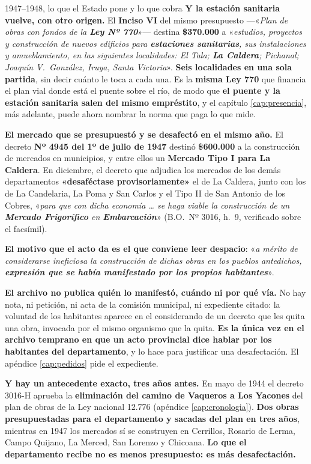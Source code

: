 \begin{ficha}{1947--1948, lo que el Estado pone y lo que cobra}
\textbf{Y la estación sanitaria vuelve, con otro origen.} El \textbf{Inciso VI} del mismo
presupuesto ---«\textit{Plan de obras con fondos de la \textbf{Ley Nº 770}}»--- destina
\textbf{\$370.000} a «\textit{estudios, proyectos y construcción de nuevos edificios para
\textbf{estaciones sanitarias}, sus instalaciones y amueblamiento, en las siguientes
localidades: El Tala; \textbf{La Caldera}; Pichanal; Joaquín V.\ González, Iruya, Santa
Victoria}». \textbf{Seis localidades en una sola partida}, sin decir cuánto le toca a cada una.
Es la \textbf{misma Ley 770} que financia el plan vial donde está el puente sobre el río, de
modo que \textbf{el puente y la estación sanitaria salen del mismo empréstito}, y el capítulo
\ref{cap:presencia}, más adelante, puede ahora nombrar la norma que paga lo que mide.

\textbf{El mercado que se presupuestó y se desafectó en el mismo año.} El decreto
\textbf{Nº 4945 del 1º de julio de 1947} destinó \textbf{\$600.000} a la construcción de
mercados en municipios, y entre ellos un \textbf{Mercado Tipo I para La Caldera}. En
diciembre, el decreto que adjudica los mercados de los demás departamentos
\textbf{«desaféctase provisoriamente»} el de La Caldera, junto con los de La Candelaria, La
Poma y San Carlos y el Tipo II de San Antonio de los Cobres, «\textit{para que con dicha
economía \ldots{} se haga viable la construcción de un \textbf{Mercado Frigorífico} en
\textbf{Embarcación}}» (B.O.\ Nº 3016, h.\ 9, verificado sobre el facsímil).

\begin{cautela}
\textbf{El motivo que el acto da es el que conviene leer despacio}: «\textit{a mérito de
considerarse ineficiosa la construcción de dichas obras en los pueblos antedichos,
\textbf{expresión que se había manifestado por los propios habitantes}}».

\textbf{El archivo no publica quién lo manifestó, cuándo ni por qué vía.} No hay nota, ni
petición, ni acta de la comisión municipal, ni expediente citado: la voluntad de los
habitantes aparece en el considerando de un decreto que les quita una obra, invocada por el
mismo organismo que la quita. \textbf{Es la única vez en el archivo temprano en que un acto
provincial dice hablar por los habitantes del departamento}, y lo hace para justificar una
desafectación. El apéndice \ref{cap:pedidos} pide el expediente.

\textbf{Y hay un antecedente exacto, tres años antes.} En mayo de 1944 el decreto 3016-H
aprueba la \textbf{eliminación del camino de Vaqueros a Los Yacones} del plan de obras de la
Ley nacional 12.776 (apéndice \ref{cap:cronologia}). \textbf{Dos obras presupuestadas para el
departamento y sacadas del plan en tres años}, mientras en 1947 los mercados sí se construyen
en Cerrillos, Rosario de Lerma, Campo Quijano, La Merced, San Lorenzo y Chicoana. \textbf{Lo
que el departamento recibe no es menos presupuesto: es más desafectación.}
\end{cautela}


\end{ficha}
